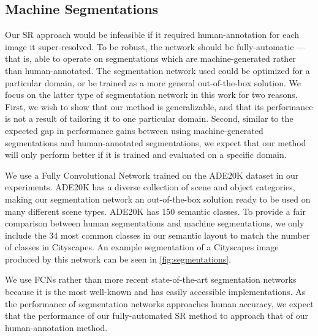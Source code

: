 \documentclass[10pt,twocolumn,letterpaper]{article}
\begin{document}
\subsection{Machine Segmentations}
Our SR approach would be infeasible if it required human-annotation for each
image it super-resolved. To be robust, the network should be fully-automatic
--- that is, able to operate on segmentations which are machine-generated
rather than human-annotated. The segmentation network used could be optimized
for a particular domain, or be trained as a more general out-of-the-box
solution. We focus on the latter type of segmentation network in this work for
two reasons. First, we wish to show that our method is generalizable, and that
its performance is not a result of tailoring it to one particular domain.
Second, similar to the expected gap in performance gains between using
machine-generated segmentations and human-annotated segmentations, we expect
that our method will only perform better if it is trained and evaluated on a
specific domain.

We use a Fully Convolutional Network \cite{FullyConvolutionalSS} trained on the
ADE20K dataset \cite{ADE20K} in our experiments. ADE20K has a diverse
collection of scene and object categories, making our segmentation network an
out-of-the-box solution ready to be used on many different scene types.
ADE20K has 150 semantic classes. To provide a fair comparison between human
segmentations and machine segmentations, we only include the 34 most common
classes in our semantic layout to match the number of classes in Cityscapes. An
example segmentation of a Cityscapes image produced by this network can be seen
in \ref{fig:segmentations}.

We use FCNs rather than more recent state-of-the-art segmentation networks
because it is the most well-known and has easily accessible implementations. As
the performance of segmentation networks approaches human accuracy, we expect
that the performance of our fully-automated SR method to approach that of our
human-annotation method.
\end{document}
